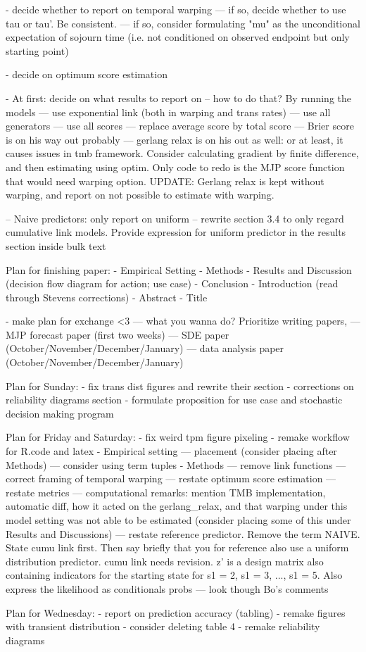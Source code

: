- decide whether to report on temporal warping
--- if so, decide whether to use tau or tau'. Be consistent.
--- if so, consider formulating "mu" as the unconditional expectation of sojourn time (i.e. not conditioned on observed endpoint but only starting point)

- decide on optimum score estimation

- At first: decide on what results to report on
-- how to do that? By running the models
--- use exponential link (both in warping and trans rates)
--- use all generators
--- use all scores
--- replace average score by total score
--- Brier score is on his way out probably
--- gerlang relax is on his out as well: or at least, it causes issues in tmb framework. Consider calculating gradient by finite difference, and then estimating using optim. Only code to redo is the MJP score function that would need warping option. UPDATE: Gerlang relax is kept without warping, and report on not possible to estimate with warping.


-- Naive predictors: only report on uniform
-- rewrite section 3.4 to only regard cumulative link models. Provide expression for uniform predictor in the results section inside bulk text






Plan for finishing paper:
- Empirical Setting
- Methods
- Results and Discussion (decision flow diagram for action; use case)
- Conclusion
- Introduction (read through Stevens corrections)
- Abstract 
- Title

- make plan for exchange <3
--- what you wanna do? Prioritize writing papers, 
--- MJP forecast paper (first two weeks)
--- SDE paper (October/November/December/January)
--- data analysis paper (October/November/December/January)




Plan for Sunday: 
- fix trans dist figures and rewrite their section %
- corrections on reliability diagrams section %
- formulate proposition for use case and stochastic decision making program %


Plan for Friday and Saturday:
- fix weird tpm figure pixeling %
- remake workflow for R.code and latex %
- Empirical setting %
--- placement (consider placing after Methods) %
--- consider using term tuples %
- Methods
--- remove link functions %
--- correct framing of temporal warping %
--- restate optimum score estimation %
--- restate metrics %
--- computational remarks: mention TMB implementation, automatic diff, how it acted on the gerlang_relax, and that warping under this model setting was not able to be estimated (consider placing some of this under Results and Discussions) %
--- restate reference predictor. Remove the term NAIVE. State cumu link first. Then say briefly that you for reference also use a uniform distribution predictor. cumu link needs revision. z' is a design matrix also containing indicators for the starting state for s1 = 2, s1 = 3, ..., s1 = 5. Also express the likelihood as conditionals probs %
--- look though Bo's comments %


Plan for Wednesday: 
- report on prediction accuracy (tabling) %
- remake figures with transient distribution %
- consider deleting table 4
- remake reliability diagrams %


